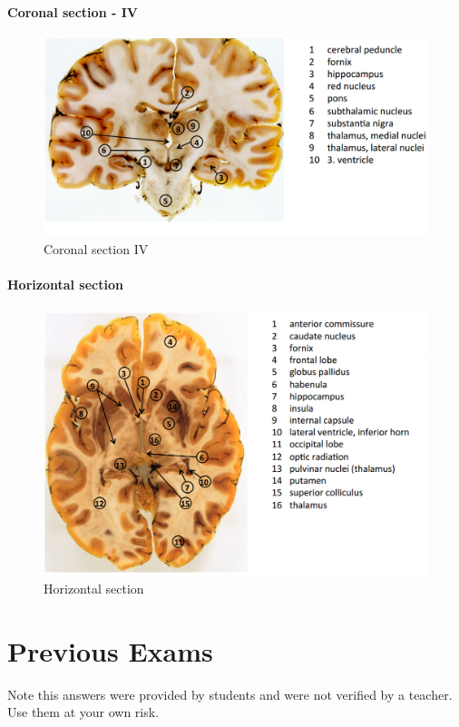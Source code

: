 \documentclass[12pt,article,oneside,a4paper]{memoir}
\begin{document}
\paragraph{Coronal section - IV}
\begin{figure}[H]
	\centering
  	\includegraphics[width=\linewidth]{imgs/coronal-section-IV-answer.png}
	\caption{Coronal section IV}
  	\label{fig:coronalSectionI}
\end{figure}

\paragraph{Horizontal section}
\begin{figure}[H]
	\centering
  	\includegraphics[width=\linewidth]{imgs/horizontal-section-answer.png}
	\caption{Horizontal section}
  	\label{fig:coronalSectionI}
\end{figure}


\newpage

\section{Previous Exams}
Note this answers were provided by students and were not verified by a teacher. Use them at your own risk.
\end{document}
